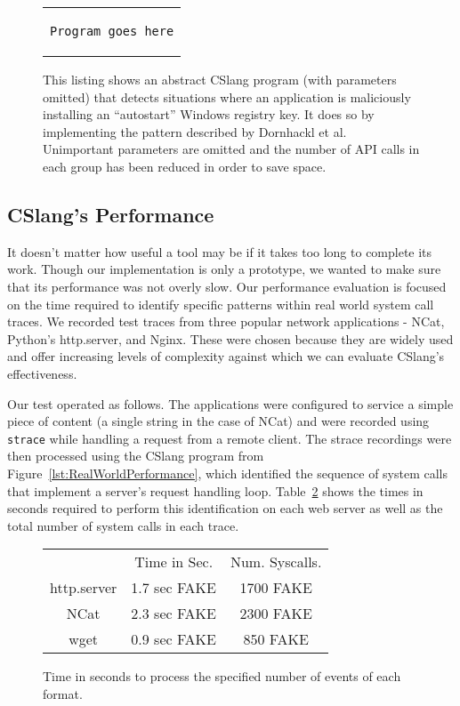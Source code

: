 \begin{figure}[H]
\centering
\begin{tabular}{c}
\begin{lstlisting}
Program goes here
\end{lstlisting}
\end{tabular}
  \caption{This listing shows an abstract CSlang program (with parameters
  omitted) that detects situations where an application is maliciously
  installing an ``autostart'' Windows registry key.  It does so by
  implementing the pattern described by Dornhackl et al.  Unimportant
  parameters are omitted and the number of API calls in each group has been
  reduced in order to save space.}
\label{lst:CSlangRegDetect}
\end{figure}


\subsection{CSlang's Performance}

It doesn't matter how useful a tool may be
if it takes too long to complete its work.
Though our implementation is
only a prototype, we wanted to make sure that its performance was not
overly slow.
Our performance evaluation
is focused on the time required
to identify specific
patterns within real world system call traces.
We recorded test traces
from three popular network applications -
NCat,
Python's http.server,
and Nginx.
These
were chosen because they are widely used and
offer increasing levels of complexity against which we can evaluate
CSlang's effectiveness.

Our test operated as follows.  The applications were configured to service
a simple piece of content (a single string in the case of NCat) and were
recorded using {\tt strace} while handling a request from a remote client.
The strace
recordings were then processed using the CSlang program from
Figure~\ref{lst:RealWorldPerformance},  which
identified the sequence of system calls that implement
a server's request handling
loop.  Table~\ref{tbl:RealWorldPerformance}
shows the times in seconds required to perform this identification on each
web server as well as the total number of system calls in each trace.

\begin{figure}
  \begin{tabular}{|c|c|c}
                & Time in Sec. & Num. Syscalls.\\
  http.server   & 1.7 sec FAKE & 1700 FAKE      \\
  NCat          & 2.3 sec FAKE & 2300 FAKE      \\
  wget          & 0.9 sec FAKE & 850  FAKE      \\
\end{tabular}
\caption{Time in seconds to process the specified number of events of each format.}
\label{tbl:RealWorldPerformance}
\end{figure}


